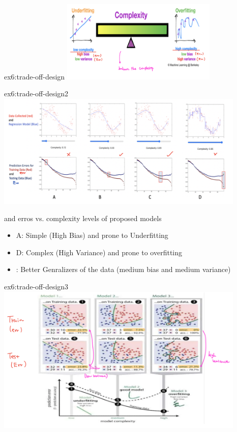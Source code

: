 \documentclass{tron}
\begin{document}
\begin{example}{ex6:trade-off-design}
	\includegraphics[width=280px]{Figs/Lec6/gen-1.png}
\end{example}

\begin{example}{ex6:trade-off-design2}
	\includegraphics[width=450px]{Figs/Lec6/gen-2.png}
	
	 and  erros vs. complexity levels of proposed models
	
	\begin{itemize}
		\item A: Simple (High Bias) and prone to Underfitting
		\item D: Complex (High Variance) and prone to overfitting
		\item {}: Better Genralizers of the data (medium bias and medium variance)
	\end{itemize}
\end{example}

\begin{example}{ex6:trade-off-design3}
	\includegraphics[width=450px]{Figs/Lec6/gen-3.png}
\end{example}
\end{document}
